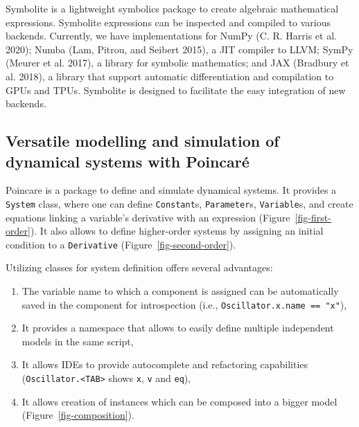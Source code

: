 \documentclass[
  letterpaper,
  DIV=11,
  numbers=noendperiod]{scrartcl}
\providecommand{\tightlist}{%
  \setlength{\itemsep}{0pt}\setlength{\parskip}{0pt}}\usepackage{longtable,booktabs,array}
\begin{document}
Symbolite is a lightweight symbolics package to create algebraic
mathematical expressions. Symbolite expressions can be inspected and
compiled to various backends. Currently, we have implementations for
NumPy (C. R. Harris et al. 2020); Numba (Lam, Pitrou, and Seibert 2015),
a \ac{JIT} compiler to LLVM; SymPy (Meurer et al. 2017), a
library for symbolic mathematics; and JAX (Bradbury et al. 2018), a
library that support automatic differentiation and compilation to \acp{GPU}
and \acp{TPU}. Symbolite is designed to facilitate the easy integration of
new backends.

\hypertarget{versatile-modelling-and-simulation-of-dynamical-systems-with-poincaruxe9}{%
\subsection{Versatile modelling and simulation of dynamical systems with
Poincaré}\label{versatile-modelling-and-simulation-of-dynamical-systems-with-poincaruxe9}}



Poincare is a package to define and simulate dynamical systems. It
provides a \texttt{System} class, where one can define
\texttt{Constant}s, \texttt{Parameter}s, \texttt{Variable}s, and create
equations linking a variable's derivative with an expression
(Figure~\ref{fig-first-order}). It also allows to define higher-order
systems by assigning an initial condition to a \texttt{Derivative}
(Figure~\ref{fig-second-order}).

Utilizing classes for system definition offers several advantages:

\begin{enumerate}
\def\labelenumi{\arabic{enumi}.}
\tightlist
\item
  The variable name to which a component is assigned can be
  automatically saved in the component for introspection (i.e.,
  \texttt{Oscillator.x.name\ ==\ "x"}),
\item
  It provides a namespace that allows to easily define multiple
  independent models in the same script,
\item
  It allows \acp{IDE} to provide autocomplete and refactoring capabilities
  (\texttt{Oscillator.\textless{}TAB\textgreater{}} shows \texttt{x},
  \texttt{v} and \texttt{eq}),
\item
  It allows creation of instances which can be composed into a bigger
  model (Figure~\ref{fig-composition}).
\end{enumerate}
\end{document}
